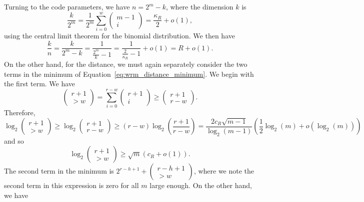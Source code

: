 \documentclass{article}
\begin{document}
Turning to the code parameters, we have $n = 2^m-k$, where the dimension $k$ is
\begin{equation}
    \frac{k}{2^m} = \frac{1}{2^m}\sum_{i=0}^w\begin{pmatrix}
        m-1\\i
    \end{pmatrix} = \frac{\kappa_R}{2} + o(1),
\end{equation}
using the central limit theorem for the binomial distribution.
We then have
\begin{equation}
    \frac{k}{n} = \frac{k}{2^m-k} = \frac{1}{\frac{2^m}{k}-1} = \frac{1}{\frac{2}{\kappa_R}-1} + o(1) = R + o(1).
\end{equation}
On the other hand, for the distance, we must again separately consider the two terms in the minimum of Equation~\eqref{eq:wrm_distance_minimum}. We begin with the first term. We have
\begin{equation}
    \begin{pmatrix}
        r+1\\>w
    \end{pmatrix} = \sum_{i=0}^{r-w}\begin{pmatrix}
        r+1\\i
    \end{pmatrix} \geq \begin{pmatrix}
        r+1\\r-w
    \end{pmatrix}.
\end{equation}
Therefore,
\begin{equation}
    \log_2\begin{pmatrix}
        r+1\\>w
    \end{pmatrix}\geq \log_2\begin{pmatrix}
        r+1\\r-w
    \end{pmatrix} \geq (r-w)\log_2\left(\frac{r+1}{r-w}\right)=\frac{2c_R\sqrt{m-1}}{\log_2(m-1)}\left(\frac{1}{2}\log_2(m)+o(\log_2(m))\right)
\end{equation}
and so
\begin{equation}
    \log_2\begin{pmatrix}
        r+1\\>w
    \end{pmatrix}\geq\sqrt{m}\left(c_R+o(1)\right).
\end{equation}
The second term in the minimum is $2^{r-h+1}+\left(\begin{smallmatrix}r-h+1\\>w\end{smallmatrix}\right)$, where we note the second term in this expression is zero for all $m$ large enough. On the other hand, we have
\end{document}
